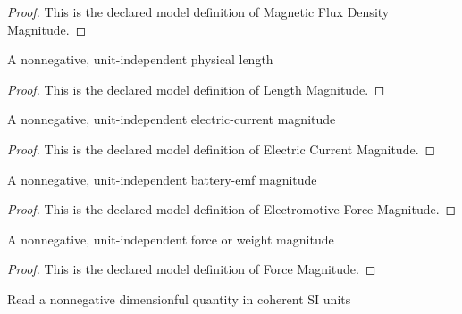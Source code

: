 \begin{proof}
  This is the declared model definition of Magnetic Flux Density Magnitude.
\end{proof}
\begin{definition}
  \label{def:physics:phyx-mini-0946:phyxminiproblems-problemphyxmini0946-lengthmagnitude}
  A nonnegative, unit-independent physical length
\end{definition}
\begin{proof}
  This is the declared model definition of Length Magnitude.
\end{proof}
\begin{definition}
  \label{def:physics:phyx-mini-0946:phyxminiproblems-problemphyxmini0946-electriccurrentmagnitude}
  A nonnegative, unit-independent electric-current magnitude
\end{definition}
\begin{proof}
  This is the declared model definition of Electric Current Magnitude.
\end{proof}
\begin{definition}
  \label{def:physics:phyx-mini-0946:phyxminiproblems-problemphyxmini0946-electromotiveforcemagnitude}
  A nonnegative, unit-independent battery-emf magnitude
\end{definition}
\begin{proof}
  This is the declared model definition of Electromotive Force Magnitude.
\end{proof}
\begin{definition}
  \label{def:physics:phyx-mini-0946:phyxminiproblems-problemphyxmini0946-forcemagnitude}
  A nonnegative, unit-independent force or weight magnitude
\end{definition}
\begin{proof}
  This is the declared model definition of Force Magnitude.
\end{proof}
\begin{definition}
  \label{def:physics:phyx-mini-0946:phyxminiproblems-problemphyxmini0946-nonnegativesireadout}
  Read a nonnegative dimensionful quantity in coherent SI units
\end{definition}
